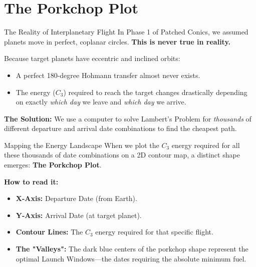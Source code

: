 \documentclass[11pt]{beamer}
\begin{document}
\section{The Porkchop Plot}

\begin{frame}{The Reality of Interplanetary Flight}
    In Phase 1 of Patched Conics, we assumed planets move in perfect, coplanar circles. \textbf{This is never true in reality.}
    
    \vspace{0.3cm}
    Because target planets have eccentric and inclined orbits:
    \begin{itemize}
        \item A perfect 180-degree Hohmann transfer almost never exists.
        \item The energy ($C_3$) required to reach the target changes drastically depending on exactly \textit{which day} we leave and \textit{which day} we arrive.
    \end{itemize}
    
    \vspace{0.3cm}
    \textbf{The Solution:} We use a computer to solve Lambert's Problem for \textit{thousands} of different departure and arrival date combinations to find the cheapest path.
\end{frame}

\begin{frame}{Mapping the Energy Landscape}
    When we plot the $C_3$ energy required for all these thousands of date combinations on a 2D contour map, a distinct shape emerges: \textbf{The Porkchop Plot}.
    
    \vspace{0.3cm}
    \textbf{How to read it:}
    \begin{itemize}
        \item \textbf{X-Axis:} Departure Date (from Earth).
        \item \textbf{Y-Axis:} Arrival Date (at target planet).
        \item \textbf{Contour Lines:} The $C_3$ energy required for that specific flight.
        \item \textbf{The "Valleys":} The dark blue centers of the porkchop shape represent the optimal Launch Windows—the dates requiring the absolute minimum fuel.
    \end{itemize}
\end{frame}
\end{document}
